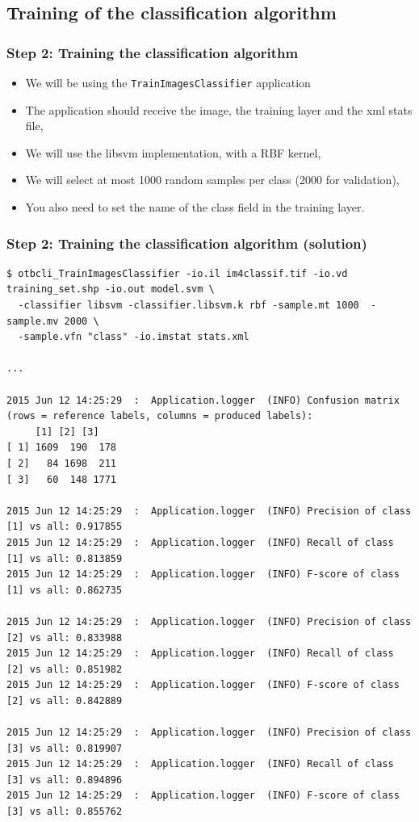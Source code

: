 \documentclass[8pt]{beamer}
\begin{document}
\subsection{Training of the classification algorithm}

\begin{frame}
\frametitle{Step 2: Training the classification algorithm}

\begin{itemize}
\item We will be using the \texttt{TrainImagesClassifier} application
\item The application should receive the image, the training layer and the xml stats file,
\item We will use the libsvm implementation, with a RBF kernel,
\item We will select at most 1000 random samples per class (2000 for validation),
\item You also need to set the name of the class field in the training layer.
\end{itemize}


\end{frame}


\begin{frame}[fragile]
\frametitle{Step 2: Training the classification algorithm (solution)}

\begin{scriptsize}
\begin{verbatim}
$ otbcli_TrainImagesClassifier -io.il im4classif.tif -io.vd training_set.shp -io.out model.svm \
  -classifier libsvm -classifier.libsvm.k rbf -sample.mt 1000  -sample.mv 2000 \
  -sample.vfn "class" -io.imstat stats.xml

...

2015 Jun 12 14:25:29  :  Application.logger  (INFO) Confusion matrix (rows = reference labels, columns = produced labels):
     [1] [2] [3] 
[ 1] 1609  190  178 
[ 2]   84 1698  211 
[ 3]   60  148 1771 

2015 Jun 12 14:25:29  :  Application.logger  (INFO) Precision of class [1] vs all: 0.917855
2015 Jun 12 14:25:29  :  Application.logger  (INFO) Recall of class    [1] vs all: 0.813859
2015 Jun 12 14:25:29  :  Application.logger  (INFO) F-score of class   [1] vs all: 0.862735

2015 Jun 12 14:25:29  :  Application.logger  (INFO) Precision of class [2] vs all: 0.833988
2015 Jun 12 14:25:29  :  Application.logger  (INFO) Recall of class    [2] vs all: 0.851982
2015 Jun 12 14:25:29  :  Application.logger  (INFO) F-score of class   [2] vs all: 0.842889

2015 Jun 12 14:25:29  :  Application.logger  (INFO) Precision of class [3] vs all: 0.819907
2015 Jun 12 14:25:29  :  Application.logger  (INFO) Recall of class    [3] vs all: 0.894896
2015 Jun 12 14:25:29  :  Application.logger  (INFO) F-score of class   [3] vs all: 0.855762

\end{verbatim}
\end{scriptsize}

\end{frame}
\end{document}
